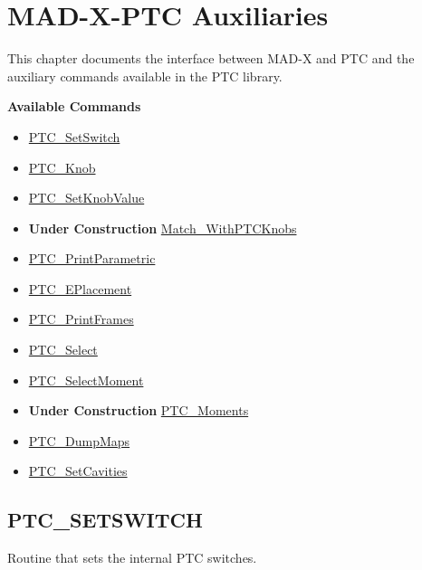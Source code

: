 
\chapter{MAD-X-PTC Auxiliaries}
\label{chap:ptc_auxiliaries}

This chapter documents the interface between MAD-X and PTC and the
auxiliary commands available in the PTC library.

{\bf Available Commands }
\begin{itemize}
   \item \href{PTC_SetSwitch.html}{ PTC\_SetSwitch}
   \item \href{PTC_Knob.html}{ PTC\_Knob}
   \item \href{PTC_SetKnobValue.html}{ PTC\_SetKnobValue}
   \item {\bf Under Construction} \href{Match_WithPTCKnobs.html}{ Match\_WithPTCKnobs}
   \item \href{PTC_PrintParametric.html}{ PTC\_PrintParametric}
   \item \href{PTC_EPlacement.html}{ PTC\_EPlacement}
   \item \href{PTC_PrintFrames.html}{ PTC\_PrintFrames}
   \item \href{PTC_Select.html}{ PTC\_Select}
   \item \href{PTC_SelectMoment.html}{ PTC\_SelectMoment}
   \item {\bf Under Construction} \href{PTC_Moments.html}{ PTC\_Moments}
   \item \href{PTC_DumpMaps.html}{  PTC\_DumpMaps}
   \item \href{PTC_SetCavities.html}{ PTC\_SetCavities}
\end{itemize}

\newpage

%

\section{PTC\_SETSWITCH}
\label{sec:ptc_setswitch}

Routine that sets the internal PTC switches.


